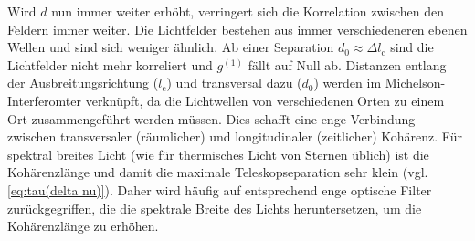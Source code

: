 Wird $d$ nun immer weiter erhöht, verringert sich die Korrelation zwischen den Feldern immer weiter. 
Die Lichtfelder bestehen aus immer verschiedeneren ebenen Wellen und sind sich weniger ähnlich. 
Ab einer Separation $d_0 \approx \Delta l_\mathrm{c}$ sind die Lichtfelder nicht mehr korreliert und $g^{(1)}$ fällt auf Null ab. 
Distanzen entlang der Ausbreitungsrichtung ($l_\mathrm{c}$) und transversal dazu ($d_0$) werden im Michelson-Interferomter verknüpft, da die Lichtwellen von verschiedenen Orten zu einem Ort zusammengeführt werden müssen.
Dies schafft eine enge Verbindung zwischen transversaler (räumlicher) und longitudinaler (zeitlicher) Kohärenz.  
Für spektral breites Licht (wie für thermisches Licht von Sternen üblich) ist die Kohärenzlänge und damit die maximale Teleskopseparation sehr klein (vgl. \autoref{eq:tau(delta nu)}). 
Daher wird häufig auf entsprechend enge optische Filter zurückgegriffen, die die spektrale Breite des Lichts heruntersetzen, um die Kohärenzlänge zu erhöhen. \\


